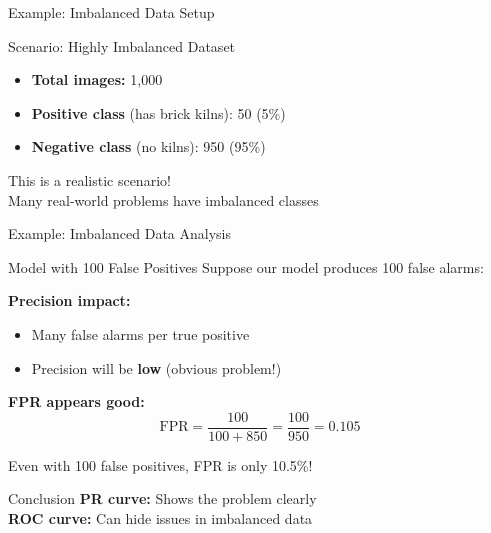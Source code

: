 \documentclass{beamer}
\begin{document}
\begin{frame}{Example: Imbalanced Data Setup}
\begin{examplebox}{Scenario: Highly Imbalanced Dataset}
\small
\begin{itemize}
    \item \textbf{Total images:} 1,000
    \item \textbf{Positive class} (has brick kilns): 50 (5\%)
    \item \textbf{Negative class} (no kilns): 950 (95\%)
\end{itemize}
\end{examplebox}

\vspace{0.2cm}

\begin{center}
\Large
This is a realistic scenario! \\
Many real-world problems have imbalanced classes
\end{center}
\end{frame}

\begin{frame}{Example: Imbalanced Data Analysis}
\begin{alertblock}{Model with 100 False Positives}
\small
Suppose our model produces 100 false alarms:

\vspace{0.15cm}

\textbf{Precision impact:}
\begin{itemize}
    \item Many false alarms per true positive
    \item Precision will be \textbf{low} (obvious problem!)
\end{itemize}

\vspace{0.15cm}

\textbf{FPR appears good:}
$$\text{FPR} = \frac{100}{100 + 850} = \frac{100}{950} = 0.105$$

Even with 100 false positives, FPR is only 10.5\%!
\end{alertblock}

\vspace{0.15cm}

\begin{keypointsbox}{Conclusion}
\small
\textbf{PR curve:} Shows the problem clearly \\
\textbf{ROC curve:} Can hide issues in imbalanced data
\end{keypointsbox}
\end{frame}
\end{document}
